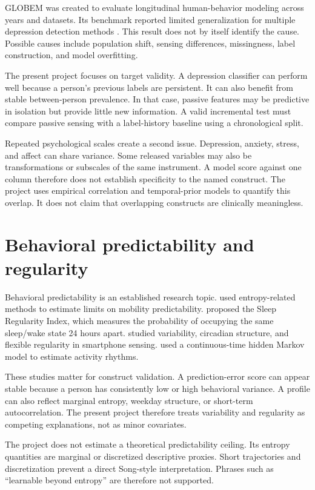 \documentclass[a4paper,11pt,oneside]{report}
\begin{document}
GLOBEM was created to evaluate longitudinal human-behavior modeling across years and
datasets. Its benchmark reported limited generalization for multiple depression
detection methods \citep{xu2022globem}. This result does not by itself identify the
cause. Possible causes include population shift, sensing differences, missingness,
label construction, and model overfitting.

The present project focuses on target validity. A depression classifier can perform
well because a person's previous labels are persistent. It can also benefit from
stable between-person prevalence. In that case, passive features may be predictive
in isolation but provide little new information. A valid incremental test must
compare passive sensing with a label-history baseline using a chronological split.

Repeated psychological scales create a second issue. Depression, anxiety, stress,
and affect can share variance. Some released variables may also be transformations
or subscales of the same instrument. A model score against one column therefore does
not establish specificity to the named construct. The project uses empirical
correlation and temporal-prior models to quantify this overlap. It does not claim
that overlapping constructs are clinically meaningless.

\section{Behavioral predictability and regularity}

Behavioral predictability is an established research topic. \citet{song2010limits}
used entropy-related methods to estimate limits on mobility predictability.
\citet{phillips2017irregular} proposed the Sleep Regularity Index, which measures the
probability of occupying the same sleep/wake state 24 hours apart.
\citet{wang2018sensing} studied variability, circadian structure, and flexible
regularity in smartphone sensing. \citet{ren2022activity} used a continuous-time
hidden Markov model to estimate activity rhythms.

These studies matter for construct validation. A prediction-error score can appear
stable because a person has consistently low or high behavioral variance. A profile
can also reflect marginal entropy, weekday structure, or short-term autocorrelation.
The present project therefore treats variability and regularity as competing
explanations, not as minor covariates.

The project does not estimate a theoretical predictability ceiling. Its entropy
quantities are marginal or discretized descriptive proxies. Short trajectories and
discretization prevent a direct Song-style interpretation. Phrases such as
``learnable beyond entropy'' are therefore not supported.
\end{document}
